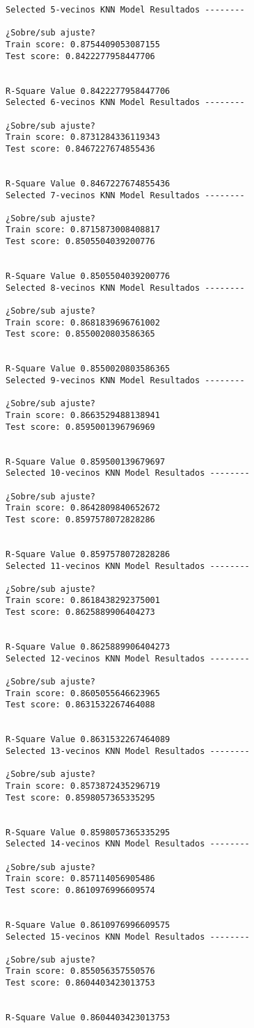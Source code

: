 \documentclass[11pt]{article}
\begin{document}
    \begin{Verbatim}[commandchars=\\\{\}]
Selected 5-vecinos KNN Model Resultados --------

¿Sobre/sub ajuste?
Train score: 0.8754409053087155
Test score: 0.8422277958447706


R-Square Value 0.8422277958447706
Selected 6-vecinos KNN Model Resultados --------

¿Sobre/sub ajuste?
Train score: 0.8731284336119343
Test score: 0.8467227674855436


R-Square Value 0.8467227674855436
Selected 7-vecinos KNN Model Resultados --------

¿Sobre/sub ajuste?
Train score: 0.8715873008408817
Test score: 0.8505504039200776


R-Square Value 0.8505504039200776
Selected 8-vecinos KNN Model Resultados --------

¿Sobre/sub ajuste?
Train score: 0.8681839696761002
Test score: 0.8550020803586365


R-Square Value 0.8550020803586365
Selected 9-vecinos KNN Model Resultados --------

¿Sobre/sub ajuste?
Train score: 0.8663529488138941
Test score: 0.8595001396796969


R-Square Value 0.859500139679697
Selected 10-vecinos KNN Model Resultados --------

¿Sobre/sub ajuste?
Train score: 0.8642809840652672
Test score: 0.8597578072828286


R-Square Value 0.8597578072828286
Selected 11-vecinos KNN Model Resultados --------

¿Sobre/sub ajuste?
Train score: 0.8618438292375001
Test score: 0.8625889906404273


R-Square Value 0.8625889906404273
Selected 12-vecinos KNN Model Resultados --------

¿Sobre/sub ajuste?
Train score: 0.8605055646623965
Test score: 0.8631532267464088


R-Square Value 0.8631532267464089
Selected 13-vecinos KNN Model Resultados --------

¿Sobre/sub ajuste?
Train score: 0.8573872435296719
Test score: 0.8598057365335295


R-Square Value 0.8598057365335295
Selected 14-vecinos KNN Model Resultados --------

¿Sobre/sub ajuste?
Train score: 0.857114056905486
Test score: 0.8610976996609574


R-Square Value 0.8610976996609575
Selected 15-vecinos KNN Model Resultados --------

¿Sobre/sub ajuste?
Train score: 0.855056357550576
Test score: 0.8604403423013753


R-Square Value 0.8604403423013753
    \end{Verbatim}
\end{document}
